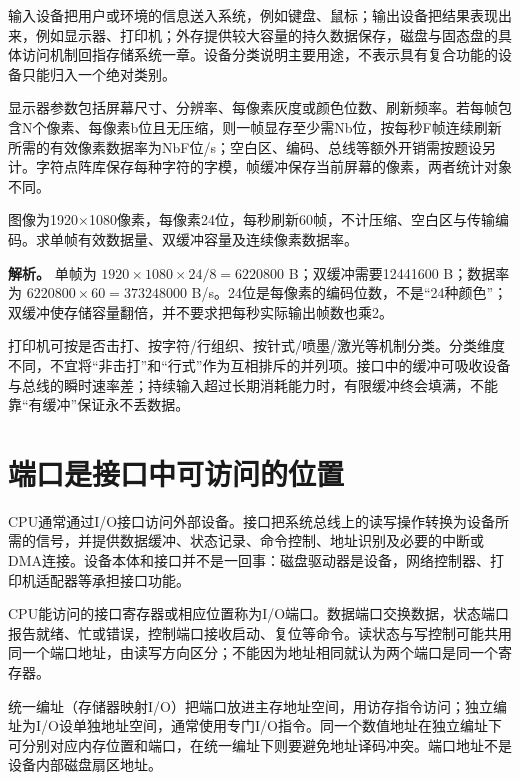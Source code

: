 输入设备把用户或环境的信息送入系统，例如键盘、鼠标；输出设备把结果表现出来，例如显示器、打印机；外存提供较大容量的持久数据保存，磁盘与固态盘的具体访问机制回指存储系统一章。设备分类说明主要用途，不表示具有复合功能的设备只能归入一个绝对类别。

显示器参数包括屏幕尺寸、分辨率、每像素灰度或颜色位数、刷新频率。若每帧包含N个像素、每像素b位且无压缩，则一帧显存至少需Nb位，按每秒F帧连续刷新所需的有效像素数据率为NbF位/s；空白区、编码、总线等额外开销需按题设另计。字符点阵库保存每种字符的字模，帧缓冲保存当前屏幕的像素，两者统计对象不同。

\begin{example}[自拟：从分辨率算显存与数据率]

图像为1920\ensuremath{\times}1080像素，每像素24位，每秒刷新60帧，不计压缩、空白区与传输编码。求单帧有效数据量、双缓冲容量及连续像素数据率。

\end{example}

\textbf{解析。} 单帧为 \(1920\times1080\times24/8=6220800\) B；双缓冲需要12441600 B；数据率为 \(6220800\times60=373248000\) B/s。24位是每像素的编码位数，不是``24种颜色''；双缓冲使存储容量翻倍，并不要求把每秒实际输出帧数也乘2。

打印机可按是否击打、按字符/行组织、按针式/喷墨/激光等机制分类。分类维度不同，不宜将``非击打''和``行式''作为互相排斥的并列项。接口中的缓冲可吸收设备与总线的瞬时速率差；持续输入超过长期消耗能力时，有限缓冲终会填满，不能靠``有缓冲''保证永不丢数据。

\section{端口是接口中可访问的位置}\label{CO07-interface}

CPU通常通过I/O接口访问外部设备。接口把系统总线上的读写操作转换为设备所需的信号，并提供数据缓冲、状态记录、命令控制、地址识别及必要的中断或DMA连接。设备本体和接口并不是一回事：磁盘驱动器是设备，网络控制器、打印机适配器等承担接口功能。

CPU能访问的接口寄存器或相应位置称为I/O端口。数据端口交换数据，状态端口报告就绪、忙或错误，控制端口接收启动、复位等命令。读状态与写控制可能共用同一个端口地址，由读写方向区分；不能因为地址相同就认为两个端口是同一个寄存器。

统一编址（存储器映射I/O）把端口放进主存地址空间，用访存指令访问；独立编址为I/O设单独地址空间，通常使用专门I/O指令。同一个数值地址在独立编址下可分别对应内存位置和端口，在统一编址下则要避免地址译码冲突。端口地址不是设备内部磁盘扇区地址。

